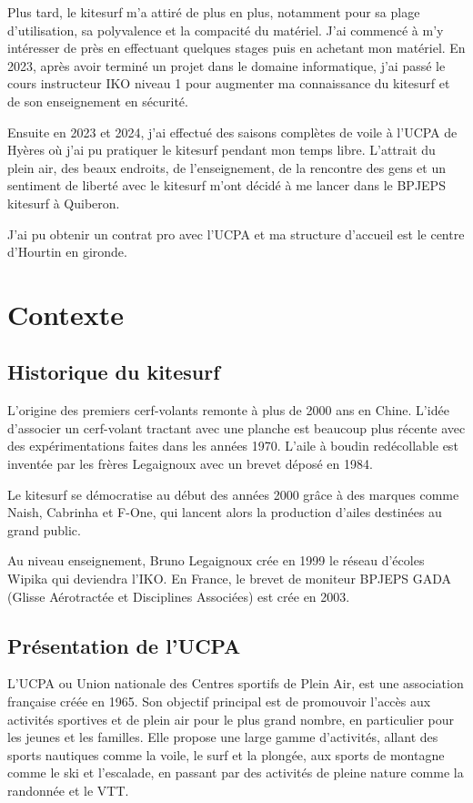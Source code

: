 \documentclass[11pt,a4paper]{report}
\begin{document}
Plus tard, le kitesurf m'a attiré de plus en plus, 
notamment pour sa plage d'utilisation, sa polyvalence et la 
compacité du matériel. J'ai commencé à m'y intéresser de pr\`es en 
effectuant quelques stages puis en achetant mon matériel.
En 2023, après avoir terminé un projet
dans le domaine informatique, j'ai passé le cours instructeur
IKO\cite{iko} niveau 1 pour augmenter ma connaissance du kitesurf
et de son enseignement en sécurité.

Ensuite en 2023 et 2024, j'ai effectué des saisons complètes de voile
à l'UCPA\cite{ucpa} de Hyères o\`u j'ai pu pratiquer le kitesurf
pendant mon temps libre. L'attrait du plein air, des beaux endroits,
de l'enseignement, de la rencontre des gens et un sentiment de liberté
avec le kitesurf  m'ont décidé à me lancer dans le BPJEPS kitesurf 
à Quiberon.

J'ai  pu obtenir un contrat pro avec l'UCPA et 
ma structure d'accueil est le centre d'Hourtin en gironde.

\section{Contexte}
\subsection{Historique du kitesurf}

L'origine des premiers cerf-volants remonte à plus de 2000 ans en Chine.
L'idée d'associer un cerf-volant tractant avec une planche est beaucoup
plus récente avec des expérimentations  faites 
dans les années 1970. L'aile à boudin redécollable est inventée 
par les frères Legaignoux avec un brevet déposé en 1984\cite{brevet_kite}.

Le kitesurf se démocratise au début des années 2000 grâce à des
marques comme Naish, Cabrinha et F-One, qui lancent alors la 
production d’ailes destinées au grand public.

Au niveau enseignement, Bruno Legaignoux crée en 1999 le
réseau d'écoles Wipika qui deviendra l'IKO\cite{iko}.
En France, le brevet de moniteur BPJEPS GADA (Glisse Aérotractée 
et Disciplines Associées) est crée en 2003.

\subsection{Présentation de l'UCPA}

L'UCPA ou Union nationale des Centres sportifs de Plein Air, est une association
française créée en 1965. Son objectif principal est
de promouvoir l'accès aux activités sportives et de plein air pour le plus grand
nombre, en particulier pour les jeunes et les familles. Elle propose une large
gamme d'activités, allant des sports nautiques comme la voile, le surf et la plongée,
aux sports de montagne comme le ski et l'escalade, en passant par des activités de
pleine nature comme la randonnée et le VTT.
\end{document}
